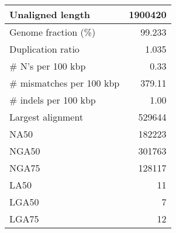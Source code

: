 \documentclass[12pt,a4paper]{article}
\begin{document}
\begin{table}[ht]
\begin{center}
\begin{tabular}{|l*{1}{|r}|}
Unaligned length & 1900420 \\ \hline
Genome fraction (\%) & 99.233 \\ \hline
Duplication ratio & 1.035 \\ \hline
\# N's per 100 kbp & 0.33 \\ \hline
\# mismatches per 100 kbp & 379.11 \\ \hline
\# indels per 100 kbp & 1.00 \\ \hline
Largest alignment & 529644 \\ \hline
NA50 & 182223 \\ \hline
NGA50 & 301763 \\ \hline
NGA75 & 128117 \\ \hline
LA50 & 11 \\ \hline
LGA50 & 7 \\ \hline
LGA75 & 12 \\ \hline
\end{tabular}
\end{center}
\end{table}
\end{document}
